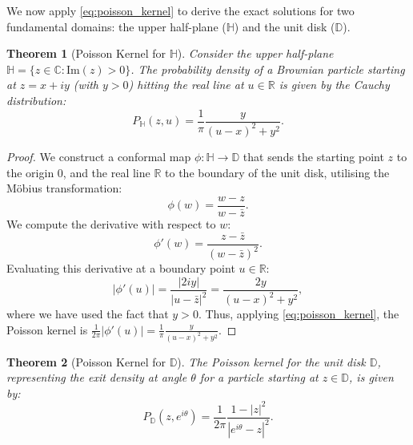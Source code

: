 \documentclass[12pt, a4paper, oneside]{report}
\newtheorem{theorem}{Theorem}[chapter]
\theoremstyle{remark}
\begin{document}
We now apply \eqref{eq:poisson_kernel} to derive the exact solutions for two fundamental domains: the upper half-plane ($\mathbb{H}$) and the unit disk ($\mathbb{D}$).

\begin{theorem}[Poisson Kernel for $\mathbb{H}$]
    \label{the:line_kernel}
Consider the upper half-plane $\mathbb{H} = \{z \in \mathbb{C} : \text{Im}(z) > 0\}$. The probability density of a Brownian particle starting at $z = x+iy$ (with $y > 0$) hitting the real line at $u \in \mathbb{R}$ is given by the Cauchy distribution:
\begin{equation*}
    P_{\mathbb{H}}(z, u) = \frac{1}{\pi} \frac{y}{(u-x)^2 + y^2}.
\end{equation*}
\end{theorem}

\begin{proof}
We construct a conformal map $\phi: \mathbb{H} \to \mathbb{D}$ that sends the starting point $z$ to the origin $0$, and the real line $\mathbb{R}$ to the boundary of the unit disk, utilising the M\"obius transformation: 
\begin{equation*}
    \phi(w) = \frac{w - z}{w - \bar{z}}.
\end{equation*}
We compute the derivative with respect to $w$:
\begin{equation*}
    \phi'(w) = \frac{z - \bar{z}}{(w - \bar{z})^2}.
\end{equation*}
Evaluating this derivative at a boundary point $u \in \mathbb{R}$:
\begin{equation*}
    |\phi'(u)| = \frac{|2iy|}{|u - \bar{z}|^2} = \frac{2y}{(u-x)^2 + y^2},
\end{equation*}
where we have used the fact that $y > 0$. Thus, applying \eqref{eq:poisson_kernel}, the Poisson kernel is $\frac{1}{2\pi}|\phi'(u)| = \frac{1}{\pi} \frac{y}{(u-x)^2 + y^2}$.
\end{proof}

\begin{theorem}[Poisson Kernel for $\mathbb{D}$]
\label{the:disk_kernel}
The Poisson kernel for the unit disk $\mathbb{D}$, representing the exit density at angle $\theta$ for a particle starting at $z \in \mathbb{D}$, is given by:
\begin{equation*}
    P_{\mathbb{D}}(z, e^{i\theta}) = \frac{1}{2\pi} \frac{1-|z|^2}{|e^{i\theta} - z|^2}.
\end{equation*}
\end{theorem}
\end{document}
